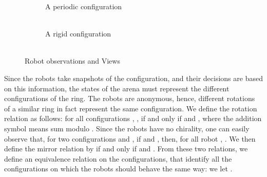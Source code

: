 \documentclass[envcountsame]{llncs} \usepackage[english]{babel}
\begin{document}
\begin{figure}[t]
\begin{subfigure}[b]{0.30\textwidth}
\begin{tikzpicture}[node distance =10em,>=stealth,->, scale=0.6, transform shape, thick]
\end{tikzpicture}
\caption{A periodic configuration \\\\ }
\label{fig:views2}
  \end{subfigure}
\begin{subfigure}[b]{0.30\textwidth}
\captionsetup{justification=centering}
\centering
{}
\caption{A rigid configuration \\\\ }
\label{fig:views3}
  \end{subfigure}
  \caption{Robot observations and Views}
  \label{fig:views}
\end{figure}






Since the robots take snapshots of the configuration, and their decisions are based on this information,
the states of the arena must represent the different configurations of the ring.
The robots are anonymous, hence, different rotations of a similar ring in fact represent the same configuration.
We define the rotation relation  as follows: for all configurations , ,
 if and only if  and , where the addition symbol 
means sum modulo .
Since the robots have no chirality, one can easily observe that, for two configurations  and , if  and
, then, for all robot , . We then define the mirror relation 
by  if and only if  and
.
From these two relations, we define an equivalence relation  on the configurations, that identify all the configurations
on which the robots should behave the same way: we let .
\end{document}
